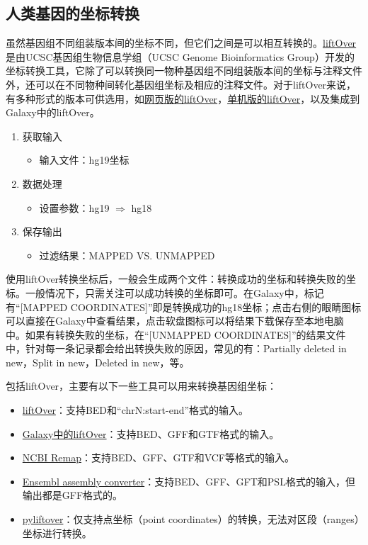 \documentclass[11pt,a4paper,twoside]{book}
\begin{document}
\subsection{人类基因的坐标转换}
虽然基因组不同组装版本间的坐标不同，但它们之间是可以相互转换的。\href{http://genome.ucsc.edu/cgi-bin/hgLiftOver}{liftOver} 是由UCSC基因组生物信息学组（UCSC Genome Bioinformatics Group）开发的坐标转换工具，它除了可以转换同一物种基因组不同组装版本间的坐标与注释文件外，还可以在不同物种间转化基因组坐标及相应的注释文件。对于liftOver来说，有多种形式的版本可供选用，如\href{http://genome.ucsc.edu/cgi-bin/hgLiftOver}{网页版的liftOver}，\href{http://hgdownload.cse.ucsc.edu/downloads.html\#source\_downloads}{单机版的liftOver}，以及集成到Galaxy中的liftOver。
\begin{enumerate}
    \item 获取输入
      \begin{itemize}
        \item 输入文件：hg19坐标
      \end{itemize}
    \item 数据处理
      \begin{itemize}
        \item 设置参数：hg19 $\Rightarrow$ hg18
      \end{itemize}
    \item 保存输出
      \begin{itemize}
        \item 过滤结果：MAPPED VS. UNMAPPED
      \end{itemize}
\end{enumerate}

使用liftOver转换坐标后，一般会生成两个文件：转换成功的坐标和转换失败的坐标。一般情况下，只需关注可以成功转换的坐标即可。在Galaxy中，标记有“[MAPPED COORDINATES]”即是转换成功的hg18坐标；点击右侧的眼睛图标可以直接在Galaxy中查看结果，点击软盘图标可以将结果下载保存至本地电脑中。如果有转换失败的坐标，在“[UNMAPPED COORDINATES]”的结果文件中，针对每一条记录都会给出转换失败的原因，常见的有：Partially deleted in new，Split in new，Deleted in new，等。

包括liftOver，主要有以下一些工具可以用来转换基因组坐标：
\begin{itemize}
  \item \href{http://genome.ucsc.edu/cgi-bin/hgLiftOver}{liftOver}：支持BED和“chrN:start-end”格式的输入。
  \item \href{https://usegalaxy.org/}{Galaxy中的liftOver}：支持BED、GFF和GTF格式的输入。
  \item \href{http://www.ncbi.nlm.nih.gov/genome/tools/remap}{NCBI Remap}：支持BED、GFF、GTF和VCF等格式的输入。
  \item \href{http://asia.ensembl.org/Homo\_sapiens/UserData/SelectFeatures}{Ensembl assembly converter}：支持BED、GFF、GFT和PSL格式的输入，但输出都是GFF格式的。
  \item \href{https://pypi.python.org/pypi/pyliftover}{pyliftover}：仅支持点坐标（point coordinates）的转换，无法对区段（ranges）坐标进行转换。
\end{itemize}
\end{document}
